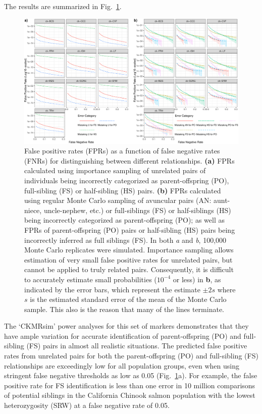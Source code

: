 The results are summarized in Fig.~\ref{fig:fprs}.
\begin{figure}
\newcommand{\fprcap}{\footnotesize False positive rates (FPRs) as a function of false negative
rates (FNRs) for distinguishing between different relationships.  {\bf (a)} FPRs calculated
using importance sampling of unrelated pairs of individuals being incorrectly categorized as parent-offspring (PO),
full-sibling (FS) or half-sibling (HS) pairs.  {\bf (b)}  FPRs calculated using regular Monte Carlo
sampling of avuncular pairs (AN: aunt-niece, uncle-nephew, etc.) or full-siblings (FS) or half-siblings (HS) being
incorrectly categorized as parent-offspring (PO); as well as FPRs of parent-offspring (PO) pairs or half-sibling (HS)
pairs being incorrectly inferred as full siblings (FS).  In both {\em a} and {\em b}, 100,000 Monte Carlo replicates
were simulated.  Importance sampling allows estimation of very small false positive rates for unrelated pairs, but
cannot be applied to truly related pairs.  Consequently, it is difficult to accurately estimate small probabilities
($10^{-4}$ or less) in {\bf b}, as indicated by the error bars, which represent the estimate $\pm 2s$ where $s$
is the estimated standard error of the mean of the Monte Carlo sample.  This also is the reason that many of the lines terminate.   }
\begin{center}
\includegraphics[width=\textwidth]{images/fpr-fnr-figure-crop.pdf}
\end{center}
\caption[\fprcap]{\fprcap}
\label{fig:fprs}
\end{figure}

The `CKMRsim' power analyses for this set of markers demonstrates that they have ample variation
for accurate identification of parent-offspring (PO) and full-sibling (FS) pairs in almost all
realistic situations. The predicted false positive rates from unrelated pairs for both the
parent-offspring (PO) and full-sibling (FS) relationships are
exceedingly low for all population groups, even when using stringent false negative thresholds as
low as 0.05 (Fig.~\ref{fig:fprs}a).
For example, the false positive rate for FS identification is less than one error in 10 million
comparisons of potential siblings in the California Chinook salmon population with the lowest
heterozygosity (SRW) at a false negative rate of 0.05. 

